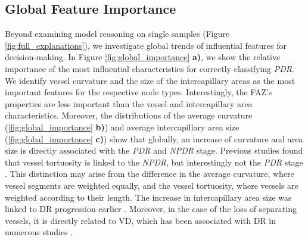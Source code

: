 \subsection{Global Feature Importance}
Beyond examining model reasoning on single samples (Figure \ref{fig:full_explanations}), we investigate global trends of influential features for decision-making. In Figure \ref{fig:global_importance} \textbf{a)}, we show the relative importance of the most influential characteristics for correctly classifying \textit{PDR}. We identify vessel curvature and the size of the intercapillary areas as the most important features for the respective node types. Interestingly, the FAZ's properties are less important than the vessel and intercapillary area characteristics. Moreover, the distributions of the average curvature (\ref{fig:global_importance} \textbf{b)}) and average intercapillary area size (\ref{fig:global_importance} \textbf{c)}) show that globally, an increase of curvature and area size is directly associated with the \textit{PDR} and \textit{NPDR} stage. Previous studies found that vessel tortuosity is linked to the \textit{NPDR}, but interestingly not the \textit{PDR} stage \cite{lee2018quantification}. This distinction may arise from the difference in the average curvature, where vessel segments are weighted equally, and the vessel tortuosity, where vessels are weighted according to their length. The increase in intercapillary area size was linked to DR progression earlier \cite{schottenhamml2016automatic}. Moreover, in the case of the loss of separating vessels, it is directly related to VD, which has been associated with DR in numerous studies \cite{sun2021optical}.